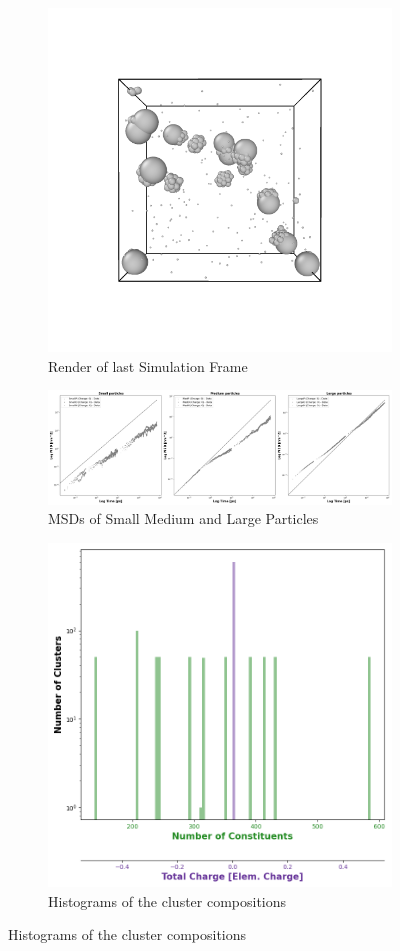 \documentclass[draft, english]{volcanica-template}
\begin{document}
\begin{figure}[!htbp]
\centering
\begin{figure}[!htbp]
\centering
\includegraphics[width=0.7\linewidth]{files/LastRender-59a2094d23a344fa815afea859df6404.png}
\caption[]{Render of last Simulation Frame}
\label{Fig5}
\end{figure}

\begin{figure}[!htbp]
\centering
\includegraphics[width=0.7\linewidth]{files/Combined_MSD-75db98ec84fc2cc33d652fda3f757cc5.png}
\caption[]{MSDs of Small Medium and Large Particles}
\label{Fig5_NoQSymTestSys-b}
\end{figure}

\begin{figure}[!htbp]
\centering
\includegraphics[width=0.7\linewidth]{files/Cluster_Histogram_Fi-8776333a8cafab1d2ee7d240283fbb8e.png}
\caption[]{Histograms of the cluster compositions}
\label{Fig5_NoQSymTestSys-c}
\end{figure}


\end{figure}
\end{document}
